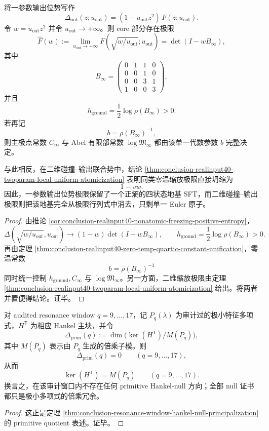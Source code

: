 \begin{theorem}\label{thm:conclusion-realinput40-oneparam-ground-vs-twoparam-atomic-collapse}
将一参数输出位势写作
\[
\Delta_{\mathrm{out}}(z;u_{\mathrm{out}})
=(1-u_{\mathrm{out}}z^2)\,F(z;u_{\mathrm{out}}).
\]
令 \(w=u_{\mathrm{out}}z^2\) 并令 \(u_{\mathrm{out}}\to+\infty\)。则 core 部分存在极限
\[
\widehat F(w)
:=
\lim_{u_{\mathrm{out}}\to+\infty}F(\sqrt{w/u_{\mathrm{out}}};u_{\mathrm{out}})
=
\det(I-wB_\infty),
\]
其中
\[
B_\infty=
\begin{pmatrix}
0&1&1&0\\
0&0&1&0\\
0&0&3&1\\
1&0&0&3
\end{pmatrix},
\]
并且
\[
h_{\mathrm{ground}}
=
\frac12\log\rho(B_\infty)>0.
\]
若再记
\[
b=\rho(B_\infty)^{-1},
\]
则主极点常数 \(C_\infty\) 与 Abel 有限部常数 \(\log\mathfrak M_\infty\) 都由该单一代数参数 \(b\) 完整决定。

与此相反，在二维碰撞--输出联合势中，结论 \ref{thm:conclusion-realinput40-twoparam-local-uniform-atomicization} 表明同类零温缩放极限直接坍缩为
\[
1-vw.
\]
因此，一参数输出位势极限保留了一个正熵的四状态地基 SFT，而二维碰撞--输出极限则把该地基完全从极限行列式中消去，只剩单一 Euler 原子。
\end{theorem}
\begin{proof}
由推论 \ref{cor:conclusion-realinput40-nonatomic-freezing-positive-entropy}，
\[
\Delta\!\left(\sqrt{w/u_{\mathrm{out}}},u_{\mathrm{out}}\right)
\longrightarrow
(1-w)\det(I-wB_\infty),
\qquad
h_{\mathrm{ground}}=\frac12\log\rho(B_\infty)>0.
\]
再由定理 \ref{thm:conclusion-realinput40-zero-temp-quartic-constant-unification}，零温常数
\[
b=\rho(B_\infty)^{-1}
\]
同时统一控制 \(h_{\mathrm{ground}}, C_\infty\) 与 \(\log\mathfrak M_\infty\)。另一方面，二维缩放极限由定理 \ref{thm:conclusion-realinput40-twoparam-local-uniform-atomicization} 给出。将两者并置便得结论。证毕。
\end{proof}

\begin{theorem}\label{thm:conclusion-resonance-window-hankel-null-principal-module}
对 audited resonance window \(q=9,\dots,17\)，记 \(P_q(\lambda)\) 为审计过的极小特征多项式，\(H^{\mathsf T}\) 为相应 Hankel 主块，并令
\[
\Delta_{\mathrm{prim}}(q):=
\dim\!\bigl(\ker(H^{\mathsf T})/M(P_q)\bigr),
\]
其中 \(M(P_q)\) 表示由 \(P_q\) 生成的倍乘子模。则
\[
\Delta_{\mathrm{prim}}(q)=0
\qquad
(q=9,\dots,17),
\]
从而
\[
\ker(H^{\mathsf T})=M(P_q)
\qquad
(q=9,\dots,17).
\]
换言之，在该审计窗口内不存在任何 primitive Hankel-null 方向；全部 null 证书都只是极小多项式的倍乘冗余。
\end{theorem}
\begin{proof}
这正是定理 \ref{thm:conclusion-resonance-window-hankel-null-principalization} 的 primitive quotient 表述。证毕。
\end{proof}

